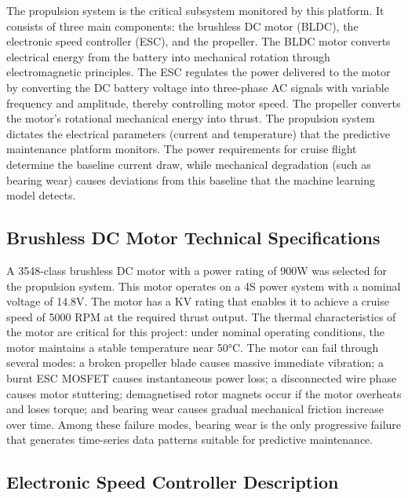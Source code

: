 The propulsion system is the critical subsystem monitored by this platform. It consists of three main components: the brushless DC motor (BLDC), the electronic speed controller (ESC), and the propeller. The BLDC motor converts electrical energy from the battery into mechanical rotation through electromagnetic principles. The ESC regulates the power delivered to the motor by converting the DC battery voltage into three-phase AC signals with variable frequency and amplitude, thereby controlling motor speed. The propeller converts the motor's rotational mechanical energy into thrust. The propulsion system dictates the electrical parameters (current and temperature) that the predictive maintenance platform monitors. The power requirements for cruise flight determine the baseline current draw, while mechanical degradation (such as bearing wear) causes deviations from this baseline that the machine learning model detects.

\subsection{Brushless DC Motor Technical Specifications}

A 3548-class brushless DC motor with a power rating of 900W was selected for the propulsion system. This motor operates on a 4S power system with a nominal voltage of 14.8V. The motor has a KV rating that enables it to achieve a cruise speed of 5000 RPM at the required thrust output. The thermal characteristics of the motor are critical for this project: under nominal operating conditions, the motor maintains a stable temperature near 50°C. The motor can fail through several modes: a broken propeller blade causes massive immediate vibration; a burnt ESC MOSFET causes instantaneous power loss; a disconnected wire phase causes motor stuttering; demagnetised rotor magnets occur if the motor overheats and loses torque; and bearing wear causes gradual mechanical friction increase over time. Among these failure modes, bearing wear is the only progressive failure that generates time-series data patterns suitable for predictive maintenance.

\subsection{Electronic Speed Controller Description}

